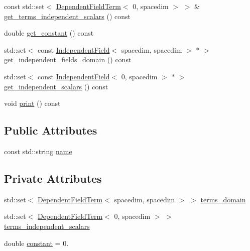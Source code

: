 \begin{DoxyCompactItemize}
\item 
const std\+::set$<$ \hyperlink{class_dependent_field_term}{Dependent\+Field\+Term}$<$ 0, spacedim $>$ $>$ \& \hyperlink{class_dependent_field_3_01spacedim_00_01spacedim_01_4_a24de9a650280f55800c5b22a1017f60d}{get\+\_\+terms\+\_\+independent\+\_\+scalars} () const 
\item 
double \hyperlink{class_dependent_field_3_01spacedim_00_01spacedim_01_4_acede82b94119d1a86f08030dbded477e}{get\+\_\+constant} () const 
\item 
std\+::set$<$ const \hyperlink{class_independent_field}{Independent\+Field}$<$ spacedim, spacedim $>$ $\ast$ $>$ \hyperlink{class_dependent_field_3_01spacedim_00_01spacedim_01_4_ac5527c93285b39f3adc70709243448f0}{get\+\_\+independent\+\_\+fields\+\_\+domain} () const 
\item 
std\+::set$<$ const \hyperlink{class_independent_field}{Independent\+Field}$<$ 0, spacedim $>$ $\ast$ $>$ \hyperlink{class_dependent_field_3_01spacedim_00_01spacedim_01_4_a793e428507763e02a79fb4c6773ada7b}{get\+\_\+independent\+\_\+scalars} () const 
\item 
void \hyperlink{class_dependent_field_3_01spacedim_00_01spacedim_01_4_afa7738e59a3352eb4242d6b31fe3ff5f}{print} () const 
\end{DoxyCompactItemize}
\subsection*{Public Attributes}
\begin{DoxyCompactItemize}
\item 
const std\+::string \hyperlink{class_dependent_field_3_01spacedim_00_01spacedim_01_4_a99a47f4c10f0e472dbdc2b0945712e23}{name}
\end{DoxyCompactItemize}
\subsection*{Private Attributes}
\begin{DoxyCompactItemize}
\item 
std\+::set$<$ \hyperlink{class_dependent_field_term}{Dependent\+Field\+Term}$<$ spacedim, spacedim $>$ $>$ \hyperlink{class_dependent_field_3_01spacedim_00_01spacedim_01_4_ace23fb05e85b4c967793e8ffce58f332}{terms\+\_\+domain}
\item 
std\+::set$<$ \hyperlink{class_dependent_field_term}{Dependent\+Field\+Term}$<$ 0, spacedim $>$ $>$ \hyperlink{class_dependent_field_3_01spacedim_00_01spacedim_01_4_a54061701af0eea90b02e56612f1491cc}{terms\+\_\+independent\+\_\+scalars}
\item 
double \hyperlink{class_dependent_field_3_01spacedim_00_01spacedim_01_4_a24efc9c0928896be871908f050c406fc}{constant} = 0.
\end{DoxyCompactItemize}


